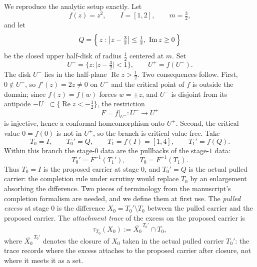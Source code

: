 We reproduce the analytic setup exactly. Let
\[
f(z)=z^{2},\qquad I=[1,2],\qquad m=\tfrac32,
\]
and let
\begin{equation}\label{eq:B-Q}
Q=\Bigl\{\,z:\bigl|z-\tfrac32\bigr|\le\tfrac12,\ \operatorname{Im}z\ge 0\,\Bigr\}
\end{equation}
be the closed upper half-disk of radius $\tfrac12$ centered at $m$. Set
\[
U^{-}=\bigl\{z:\bigl|z-\tfrac32\bigr|<1\bigr\},
\qquad
U^{+}=f(U^{-}).
\]
The disk $U^{-}$ lies in the half-plane $\operatorname{Re}z>\tfrac12$. Two
consequences follow. First, $0\notin U^{-}$, so $f'(z)=2z\ne 0$ on $U^{-}$
and the critical point of $f$ is outside the domain; since $f(z)=f(w)$ forces
$w=\pm z$, and $U^{-}$ is disjoint from its antipode
$-U^{-}\subset\{\operatorname{Re}z<-\tfrac12\}$, the restriction
\begin{equation}\label{eq:B-branch}
F=f|_{U^{-}}:U^{-}\longrightarrow U^{+}
\end{equation}
is injective, hence a conformal homeomorphism onto $U^{+}$. Second, the
critical value $0=f(0)$ is not in $U^{+}$, so the branch is
critical-value-free. Take
\begin{equation}\label{eq:B-stages}
T_0=I,\qquad T_0'=Q,\qquad T_1=f(I)=[1,4],\qquad T_1'=f(Q).
\end{equation}
Within this branch the stage-$0$ data are the pullbacks of the stage-$1$
data:
\begin{equation}\label{eq:B-pullback}
T_0'=F^{-1}(T_1'),\qquad T_0=F^{-1}(T_1).
\end{equation}
Thus $T_0=I$ is the proposed carrier at stage $0$, and $T_0'=Q$ is the actual
pulled carrier: the completion rule under scrutiny would replace $T_0$ by an
enlargement absorbing the difference. Two pieces of terminology from the
manuscript's completion formalism are needed, and we define them at first
use. The \emph{pulled excess} at stage $0$ is the difference
$X_0=T_0'\setminus T_0$ between the pulled carrier and the proposed carrier.
The \emph{attachment trace} of the excess on the proposed carrier is
\begin{equation}\label{eq:B-trace}
\tau_{T_0}(X_0):=\overline{X_0}^{\,T_0'}\cap T_0,
\end{equation}
where $\overline{X_0}^{\,T_0'}$ denotes the closure of $X_0$ taken in the
actual pulled carrier $T_0'$: the trace records where the excess attaches to
the proposed carrier after closure, not where it meets it as a set.

